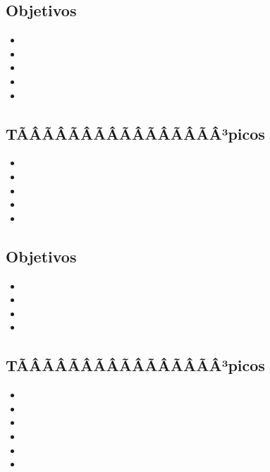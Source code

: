\subsection*{Objetivos}
\begin{itemize}
	\item \ALSIETEObjUNO
	\item \ALSIETEObjDOS
	\item \ALSIETEObjTRES
	\item \ALSIETEObjCUATRO
	\item \ALSIETEObjCINCO
\end{itemize}

\subsection{\ALOCHODef}\label{sec:BOK-AL8}

\subsection*{TÃÂÃÂÃÂÃÂÃÂÃÂÃÂÃÂ³picos}
\begin{itemize}
	\item \ALOCHOTopicAnalisis
	\item \ALOCHOTopicAlgoritmos
	\item \ALOCHOTopicAlgoritmosaleatorios
	\item \ALOCHOTopicProgramacion
	\item \ALOCHOTopicOptimizacion
\end{itemize}

\subsection*{Objetivos}
\begin{itemize}
	\item \ALOCHOObjUNO
	\item \ALOCHOObjDOS
	\item \ALOCHOObjTRES
	\item \ALOCHOObjCUATRO
\end{itemize}

\subsection{\ALNUEVEDef}\label{sec:BOK-AL9}

\subsection*{TÃÂÃÂÃÂÃÂÃÂÃÂÃÂÃÂ³picos}
\begin{itemize}
	\item \ALNUEVETopicRevision
	\item \ALNUEVETopicCriptografia
	\item \ALNUEVETopicCriptografiade
	\item \ALNUEVETopicFirmas
	\item \ALNUEVETopicProtocolos
	\item \ALNUEVETopicAplicaciones
\end{itemize}

